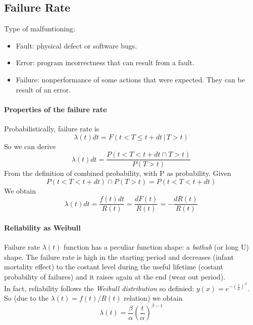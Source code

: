\documentclass{article}
\begin{document}
			\subsection{Failure Rate}
				Type of malfuntioning:
				\begin{itemize}
					\item Fault: physical defect or software bugs.
					\item Error: program incorrectness that can result from a fault.
					\item Failure: nonperformance of some actions that were expected. They can be result of an error.
				\end{itemize}
				
				\paragraph{Properties of the failure rate}
					Probabilistically, failure rate is
					\begin{equation}
						\lambda(t)dt = F(t < T \leq t+dt \,\vert\, T > t)
					\end{equation}
					So we can derive
					\begin{equation}
						\lambda(t)dt = \frac{P(t < T < t + dt \cap T > t)}{P(T > t)}
					\end{equation}
					From the definition of combined probability, with P as probability. Given
					\begin{equation}
						P(t < T < t+dt) \cap P(T > t) = P(t < T < t+dt)
					\end{equation}
					We obtain
					\begin{equation}
						\lambda(t)dt = \frac{f(t)dt}{R(t)} = \frac{dF(t)}{R(t)} = -\frac{dR(t)}{R(t)}
					\end{equation}
				
				\paragraph{Reliability as Weibull}
					Failure rate $\lambda(t)$ function has a peculiar function shape: a \emph{bathub} (or long U) shape. The failure rate is high in the starting period and decreases (infant mortality effect) to the costant level during the useful lifetime (costant probability of failures) and it raises again at the end (wear out period).\\
					
					In fact, reliability follows the \emph{Weibull distribution} so definied: $y(x) = e^{-(\frac{x}{\alpha})^{\beta}}$. So (due to the $\lambda(t) = f(t) / R(t)$ relation) we obtain
					\begin{equation}
						\lambda(t) = \frac{\beta}{\alpha}(\frac{t}{\alpha})^{\beta - 1}
					\end{equation}
					
\end{document}
